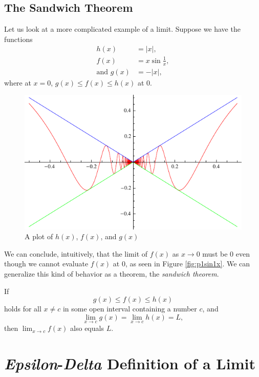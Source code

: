 \subsection{The Sandwich Theorem}

Let us look at a more complicated example of a limit.
Suppose we have the functions
\begin{align*}
  h(x) &= |x|, \\
  f(x) &= x\sin{\frac{1}{x}}, \\
  \text{and }g(x) &= -|x|,
\end{align*}
where at \(x=0\), \(g(x) \leq f(x) \leq h(x)\) at 0.
\begin{figure}[H]
  \begin{center}
    \includegraphics{graphs/sandwichtheorem.pdf}
  \end{center}
  \caption{A plot of \(h(x)\), \(f(x)\), and \(g(x)\)}
\end{figure}
We can conclude, intuitively, that the limit of \(f(x)\) as \(x \to 0\) must be
0 even though we cannot evaluate \(f(x)\) at 0, as seen in Figure
\ref{fig:p1sin1x}. We can generalize this kind of behavior as a theorem, the
\emph{sandwich theorem}.
\begin{theorem}
  If \[g(x) \leq f(x) \leq h(x)\] holds for all \(x \neq c\) in some open interval containing a number \(c\),
  and
  \[ \lim_{x \to c} g(x) = \lim_{x \to c} h(x) = L, \]
  then \(\lim_{x \to c} f(x)\) also equals $L$.
  \label{th:sandwich}
\end{theorem}

\section{\emph{Epsilon}-\emph{Delta} Definition of a Limit}

